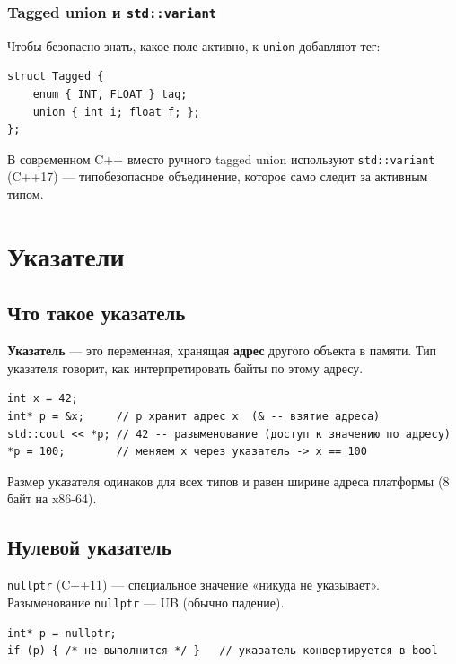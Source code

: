 \subsubsection{Tagged union и \texttt{std::variant}}

Чтобы безопасно знать, какое поле активно, к \texttt{union} добавляют тег:

\begin{lstlisting}
struct Tagged {
    enum { INT, FLOAT } tag;
    union { int i; float f; };
};
\end{lstlisting}

В современном C++ вместо ручного tagged union используют \texttt{std::variant}
(C++17) --- типобезопасное объединение, которое само следит за активным типом.


\section{Указатели}

\subsection{Что такое указатель}

\textbf{Указатель} --- это переменная, хранящая \textbf{адрес} другого объекта
в памяти. Тип указателя говорит, как интерпретировать байты по этому адресу.

\begin{lstlisting}
int x = 42;
int* p = &x;     // p хранит адрес x  (& -- взятие адреса)
std::cout << *p; // 42 -- разыменование (доступ к значению по адресу)
*p = 100;        // меняем x через указатель -> x == 100
\end{lstlisting}

Размер указателя одинаков для всех типов и равен ширине адреса платформы (8 байт
на x86-64).

\subsection{Нулевой указатель}

\texttt{nullptr} (C++11) --- специальное значение «никуда не указывает».
Разыменование \texttt{nullptr} --- UB (обычно падение).

\begin{lstlisting}
int* p = nullptr;
if (p) { /* не выполнится */ }   // указатель конвертируется в bool
\end{lstlisting}

